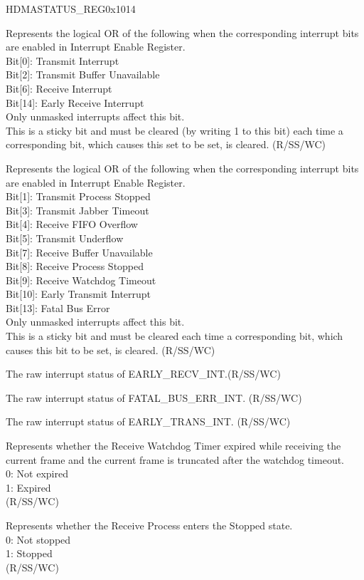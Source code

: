 \addtocounter{Regfloat}{-1}
\begin{register}{H}{DMASTATUS\_REG}{0x1014}
\begin{regdesc}\begin{reglist}
\item [Continued from the previous page...]

\item [NORM\_INT\_SUMM] Represents the logical OR of the following when the corresponding interrupt bits are enabled in Interrupt Enable Register.\\
Bit[0]: Transmit Interrupt\\
Bit[2]: Transmit Buffer Unavailable\\
Bit[6]: Receive Interrupt\\
Bit[14]: Early Receive Interrupt\\
Only unmasked interrupts affect this bit.\\This is a sticky bit and must be cleared (by writing 1 to this bit) each time a corresponding bit, which causes this set to be set, is cleared. (R/SS/WC)
\item [ABN\_INT\_SUMM] Represents the logical OR of the following when the corresponding interrupt bits are enabled in Interrupt Enable Register.\\
Bit[1]: Transmit Process Stopped\\
Bit[3]: Transmit Jabber Timeout\\
Bit[4]: Receive FIFO Overflow\\
Bit[5]: Transmit Underflow\\
Bit[7]: Receive Buffer Unavailable\\
Bit[8]: Receive Process Stopped\\
Bit[9]: Receive Watchdog Timeout\\
Bit[10]: Early Transmit Interrupt\\
Bit[13]: Fatal Bus Error\\
Only unmasked interrupts affect this bit.\\
This is a sticky bit and must be cleared each time a corresponding bit, which causes this bit to be set, is cleared. (R/SS/WC)
\item [EARLY\_RECV\_INT] The raw interrupt status of EARLY\_RECV\_INT.(R/SS/WC)
\item [FATAL\_BUS\_ERR\_INT] The raw interrupt status of FATAL\_BUS\_ERR\_INT. (R/SS/WC)
\item [EARLY\_TRANS\_INT] The raw interrupt status of  EARLY\_TRANS\_INT. (R/SS/WC)
\item [RECV\_WDT\_TO] Represents whether the Receive Watchdog Timer expired while receiving the current frame and the current frame is truncated after the watchdog timeout.\\
0: Not expired\\
1: Expired\\(R/SS/WC)
\item [RECV\_PROC\_STOP] Represents whether the Receive Process enters the Stopped state.\\
0: Not stopped\\
1: Stopped\\(R/SS/WC)


\end{reglist}
\end{regdesc}
\end{register}
